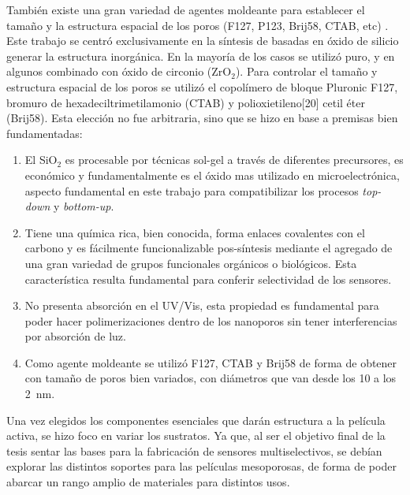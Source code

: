 	También existe una gran variedad de agentes moldeante para establecer el tamaño y la estructura espacial de los poros (F127, P123, Brij58, CTAB, etc) \cite{angelome2011,schuth2013,Soler-Illia2006,Soler-Illia2002a}. Este trabajo se centró exclusivamente en la síntesis de \pdm\space basadas en óxido de silicio generar la estructura inorgánica. En la mayoría de los casos se utilizó puro, y en algunos combinado con óxido de circonio (ZrO$_2$). Para controlar el tamaño y estructura espacial de los poros se utilizó el copolímero de bloque Pluronic F127, bromuro de hexadeciltrimetilamonio (CTAB) y polioxietileno[20] cetil éter (Brij58). Esta elección no fue arbitraria, sino que se hizo en base a premisas bien fundamentadas:
		
		\begin{enumerate}

		\item El SiO$_2$ es procesable por técnicas sol-gel a través de diferentes precursores, es económico y fundamentalmente es el óxido mas utilizado en microelectrónica, aspecto fundamental en este trabajo para compatibilizar los procesos \textit{top-down} y \textit{bottom-up}.

		\item Tiene una química rica, bien conocida, forma enlaces covalentes con el carbono y es fácilmente funcionalizable pos-síntesis mediante el agregado de una gran variedad de grupos funcionales orgánicos o biológicos. Esta característica resulta fundamental para conferir selectividad de los sensores.

		\item No presenta absorción en el UV/Vis, esta propiedad es fundamental para poder hacer polimerizaciones dentro de los nanoporos sin tener interferencias por absorción de luz.

		\item Como agente moldeante se utilizó F127, CTAB y Brij58 de forma de obtener \pdm\space con tamaño de poros bien variados, con diámetros que van desde los 10 a los \SI{2}{\nm}.

		\end{enumerate}
	
	Una vez elegidos los componentes esenciales que darán estructura a la película activa, se hizo foco en variar los sustratos. Ya que, al ser el objetivo final de la tesis sentar las bases para la fabricación de sensores multiselectivos, se debían explorar las distintos soportes para las películas mesoporosas, de forma de poder abarcar un rango amplio de materiales para distintos usos.


